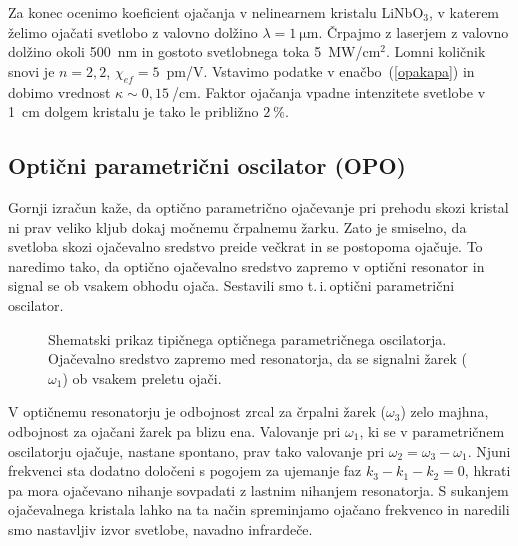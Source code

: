 Za konec ocenimo koeficient ojačanja v nelinearnem kristalu 
LiNbO$_{3}$, v katerem želimo
ojačati svetlobo z valovno dolžino $\lambda = 1~\si{\micro\metre}$. Črpajmo z laserjem z valovno dolžino 
okoli 500~nm in gostoto svetlobnega toka 5~MW/cm$^{2}$. Lomni količnik snovi je 
$n = 2,2$, $\chi_{ef} = 5$~pm/V. Vstavimo podatke v enačbo~(\ref{opakapa}) in dobimo vrednost
$\kappa \sim 0,15~$/cm. Faktor ojačanja vpadne intenzitete svetlobe v 1~cm dolgem kristalu je 
tako le približno $2~\%$. 

\subsection*{Optični parametrični oscilator (OPO)}
Gornji izračun kaže, da optično parametrično ojačevanje pri prehodu skozi kristal ni prav veliko
kljub dokaj močnemu črpalnemu žarku. Zato je smiselno, da svetloba skozi ojačevalno 
sredstvo preide večkrat in se postopoma ojačuje. To naredimo tako, 
da optično ojačevalno sredstvo zapremo v optični 
resonator
in signal se ob vsakem obhodu ojača. Sestavili smo t.\,i.\,optični parametrični oscilator. 
\begin{figure}[h]
\centering
\def\svgwidth{90truemm} 

\caption{Shematski prikaz tipičnega optičnega parametričnega oscilatorja. Ojačevalno sredstvo
zapremo med resonatorja, da se signalni žarek ($\omega_1$) ob vsakem preletu ojači.}
\label{fig:opo}
\end{figure}

V optičnemu resonatorju je odbojnost zrcal za črpalni žarek ($\omega_3$) zelo majhna, 
odbojnost za ojačani žarek pa blizu ena. Valovanje pri $\omega_1$,
ki se v parametričnem oscilatorju ojačuje, nastane spontano, prav tako valovanje pri 
$\omega_2 = \omega_3 -\omega_1$. Njuni frekvenci sta dodatno določeni s pogojem za 
ujemanje faz $ k_3 - k_1 - k_2 = 0$, 
hkrati pa mora ojačevano nihanje sovpadati z lastnim nihanjem resonatorja. 
S sukanjem ojačevalnega kristala lahko na ta način spreminjamo
ojačano frekvenco in naredili smo nastavljiv izvor svetlobe, navadno infrardeče. 

